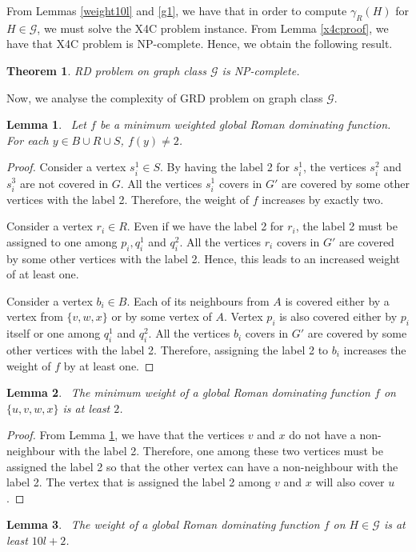 \documentclass[preprint,12pt]{elsarticle}
\newtheorem{theorem}{Theorem}[section]
\newtheorem{lemma}{Lemma}
\begin{document}
From Lemmas \ref{weight10l} and \ref{g1}, we have that in order to compute $\gamma_R(H)$ for $H \in \mathcal{G}$, we must solve the X4C problem instance. From Lemma \ref{x4cproof}, we have that X4C problem is NP-complete. Hence, we obtain the following result.
\begin{theorem}
    RD problem on graph class $\mathcal{G}$ is NP-complete.
\end{theorem}
Now, we analyse the complexity of GRD problem on graph class $\mathcal{G}$.
\begin{lemma}~\label{twovertices}
     Let $f$ be a minimum weighted global Roman dominating function. For each $y \in B \cup R \cup S$, $f(y) \neq 2$.
\end{lemma}
 \begin{proof}
    Consider a vertex $s_i^1 \in S$. By having the label 2 for $s_i^1$, the vertices $s_i^2$ and $s_i^3$ are not covered in $G$. All the vertices $s_i^1$ covers in $G'$ are covered by some other vertices with the label 2. Therefore, the weight of $f$ increases by exactly two.
    
    Consider a vertex $r_i \in R$. Even if we have the label 2 for $r_i$, the label 2 must be assigned to one among $p_i, q_i^1$ and $q_i^2$. All the vertices $r_i$ covers in $G'$ are covered by some other vertices with the label 2. Hence, this leads to an increased weight of at least one.
    
    Consider a vertex $b_i \in B$. Each of its neighbours from $A$ is covered either by a vertex from $\{v,w,x\} $ or by some vertex of $A$. Vertex $p_i$ is also covered either by $p_i$ itself or one among $q_i^1$ and $q_i^2$. All the vertices $b_i$ covers in $G'$ are covered by some other vertices with the label 2. Therefore, assigning the label 2 to $b_i$ increases the weight of $f$ by at least one.
 \end{proof}
\begin{lemma}~\label{weight1grd}
     The minimum weight of a global Roman dominating function $f$ on $\{u,v,w,x\}$ is at least $2$.
\end{lemma}
\begin{proof}
    From Lemma \ref{twovertices}, we have that the vertices $v$ and $x$ do not have a non-neighbour with the label 2. Therefore, one among these two vertices must be assigned the label 2 so that the other vertex can have a non-neighbour with the label 2. The vertex that is assigned the label 2 among $v$ and $x$ will also cover $u$. 
\end{proof}
\begin{lemma}~\label{weight10l2}
    The weight of a global Roman dominating function $f$ on $H \in \mathcal{G}$ is at least $10l+2$.
\end{lemma}
\end{document}
